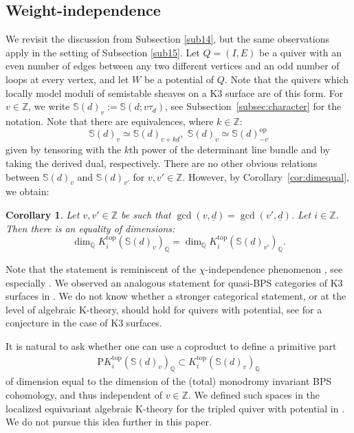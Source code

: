 \documentclass [11pt,oneside,a4paper,mathscr]{amsart}
\newtheorem{cor}[thm]{Corollary}
\theoremstyle{definition}
\newcommand{\dd}{\underline{d}}
\begin{document}
\subsection{Weight-independence}

We revisit the discussion from Subsection \ref{sub14}, but the same observations apply in the setting of Subsection \ref{sub15}. Let $Q=(I,E)$ be a quiver with an even number of edges between any two different vertices and an odd number of loops at every vertex, and let $W$ be a 
potential of $Q$. Note that the quivers which locally model moduli of semistable sheaves on a K3 surface are of this form. 
For $v \in \mathbb{Z}$, we write $\mathbb{S}(d)_v :=\mathbb{S}(d; v\tau_d)$, 
see Subsection~\ref{subsec:character} for the notation. 
Note that there are equivalences, where $k\in\mathbb{Z}$:
\[\mathbb{S}(d)_v\simeq \mathbb{S}(d)_{v+k\dd},\,\, \mathbb{S}(d)_v\simeq \mathbb{S}(d)^{\text{op}}_{-v}\]
given by tensoring with the $k$th power of the determinant line bundle and by taking the derived dual, respectively. There are no other obvious relations between $\mathbb{S}(d)_v$ and $\mathbb{S}(d)_{v'}$ for $v,v'\in\mathbb{Z}$. However, by Corollary~\ref{cor:dimequal}, we obtain:
\begin{cor}\label{corintro}
    Let $v,v'\in\mathbb{Z}$ be such that $\gcd(v,\dd)=\gcd(v',\dd)$. Let $i\in\mathbb{Z}$. Then there is an equality of dimensions:
    \[\dim_\mathbb{Q} K^{\mathrm{top}}_i(\mathbb{S}(d)_v)_{\mathbb{Q}}=\dim_\mathbb{Q} K^{\mathrm{top}}_i(\mathbb{S}(d)_{v'})_{\mathbb{Q}}.\]
\end{cor}

Note that the statement is reminiscent of the $\chi$-independence phenomenon \cite{MaulikShen, KinjoKoseki}, see especially \cite[Corollary 1.5]{KinjoKoseki}. We observed an analogous statement for quasi-BPS categories of K3 surfaces in \cite{PTK3}. We do not know whether a stronger categorical statement, or at the level of algebraic K-theory, should hold for quivers with potential, see \cite[Conjecture 1.4]{PTK3} for a conjecture in the case of K3 surfaces.

It is natural to ask whether one can use a coproduct to define a primitive part \begin{align*}\mathrm{P}K^{\mathrm{top}}_i(\mathbb{S}(d)_v)_{\mathbb{Q}}\subset K^{\mathrm{top}}_i(\mathbb{S}(d)_v)_{\mathbb{Q}}
\end{align*}
of dimension equal to the dimension of the (total) monodromy invariant BPS cohomology, and thus independent of $v\in\mathbb{Z}$. We defined such spaces in the localized equivariant algebraic K-theory for the tripled quiver with potential in \cite{PT1}. We do not pursue this idea further in this paper.
\end{document}
